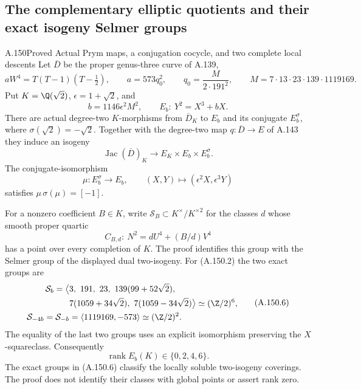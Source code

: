 \subsection{The complementary elliptic quotients and their exact isogeny Selmer groups}

\begin{statement}{A.150}{Proved}
{Actual Prym maps, a conjugation cocycle, and two complete local descents}
Let \(\overline D\) be the proper genus-three curve of A.139,
\[
 aW^4=T(T-1)(T-\tfrac12),\qquad
 a=573q_0^2,\qquad q_0=\frac{M}{2\cdot191^2},
 \qquad M=7\cdot13\cdot23\cdot139\cdot1119169.
\tag{A.150.1}
\]
Put \(K=\Q(\sqrt2)\), \(\epsilon=1+\sqrt2\), and
\[
                 b=1146\epsilon^2M^2,\qquad
                 E_b:\ Y^2=X^3+bX .
\tag{A.150.2}
\]
There are actual degree-two \(K\)-morphisms from
\(\overline D_K\) to \(E_b\) and its conjugate \(E_b^\sigma\),
where \(\sigma(\sqrt2)=-\sqrt2\).  Together with the degree-two
map \(q:\overline D\to E\) of A.143 they induce an isogeny
\[
 \operatorname{Jac}(\overline D)_K
       \longrightarrow E_K\times E_b\times E_b^\sigma .
\tag{A.150.3}
\]
The conjugate-isomorphism
\[
 \mu:E_b^\sigma\longrightarrow E_b,\qquad
             (X,Y)\longmapsto(\epsilon^2X,\epsilon^3Y)
\tag{A.150.4}
\]
satisfies \(\mu\,\sigma(\mu)=[-1]\).

For a nonzero coefficient \(B\in K\), write
\(\mathcal S_B\subset K^\times/K^{\times2}\) for the classes
\(d\) whose smooth proper quartic
\[
                    C_{B,d}:\ N^2=dU^4+(B/d)V^4
\tag{A.150.5}
\]
has a point over every completion of \(K\).
The proof identifies this group with the Selmer group of the
displayed dual two-isogeny.  For (A.150.2) the two exact groups are
\[
 \begin{aligned}
 \mathcal S_b
   =\big\langle&
       3,\ 191,\ 23,\ 139(99+52\sqrt2),\\
       &7(1059+34\sqrt2),\
         7(1059-34\sqrt2)\big\rangle
                   \simeq(\Z/2)^6,\\
 \mathcal S_{-4b}=\mathcal S_{-b}
   &=\langle1119169,-573\rangle\simeq(\Z/2)^2 .
 \end{aligned}
\tag{A.150.6}
\]
The equality of the last two groups uses an explicit
isomorphism preserving the \(X\)-squareclass.
Consequently
\[
                \operatorname{rank}E_b(K)\in\{0,2,4,6\}.
\tag{A.150.7}
\]
The exact groups in (A.150.6) classify the locally soluble
two-isogeny coverings.  The proof does not identify their
classes with global points or assert rank zero.
\end{statement}
